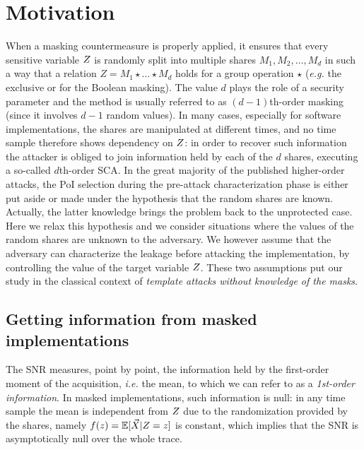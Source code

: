 \section{Motivation}
When a masking countermeasure is properly applied, it ensures that every sensitive variable $Z$  is randomly split  into multiple shares $M_1,M_2,\dots,M_d$ in such a way that a relation $Z = M_1 \star \dots \star M_d$ holds for a group operation $\star$ (\emph{e.g.} the exclusive or for the Boolean masking). The value $d$ plays the role of a security parameter and the method is usually referred to as $(d-1)$th-order masking (since it involves $d-1$ random values). In many cases, especially for software implementations, the shares are manipulated at different times, and no time sample therefore shows dependency on $Z$: in order to recover such  information the attacker is obliged to join information held by each of the $d$ shares, executing a so-called $d$th-order SCA. In the great majority of the published higher-order attacks, the PoI selection during the pre-attack characterization phase is either put aside or made  under the hypothesis that the random shares are known. Actually, the latter knowledge brings the problem back to the unprotected case. 
Here we relax this hypothesis and we consider  situations where the values of the random shares are unknown to the adversary. We however assume that the adversary can characterize the leakage before attacking the implementation, by controlling the value of the target variable $Z$. These two assumptions put our study in the classical context of {\em template attacks without knowledge of the masks}. \\

\subsection{Getting information from masked implementations}\label{sec:HO}
The SNR measures, point by point, the information held by the first-order moment of the acquisition, \emph{i.e.} the mean, to which we can refer to as a \emph{1st-order information}. In masked implementations, such information is null: in any time sample the mean is independent from $Z$ due to the randomization provided by the shares, namely $f(z) = \mathbb{E}[\vec{X}\vert Z=z]$ is constant, which implies that the SNR is asymptotically  null over the whole trace.\\
 
